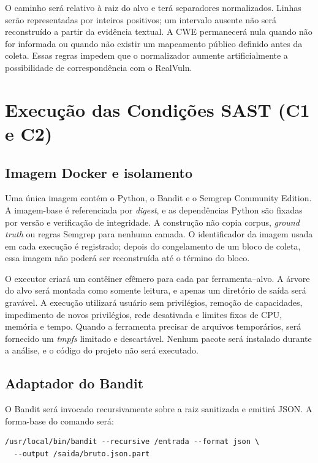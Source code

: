 O caminho será relativo à raiz do alvo e terá separadores normalizados. Linhas serão representadas por inteiros positivos; um intervalo ausente não será reconstruído a partir da evidência textual. A CWE permanecerá nula quando não for informada ou quando não existir um mapeamento público definido antes da coleta. Essas regras impedem que o normalizador aumente artificialmente a possibilidade de correspondência com o RealVuln.

\section{Execução das Condições SAST (C1 e C2)}\label{sec:execucao-sast-desenvolvimento}

\subsection{Imagem Docker e isolamento}\label{subsec:construcao-imagem-docker}

Uma única imagem contém o Python, o Bandit e o Semgrep Community Edition. A imagem-base é referenciada por \textit{digest}, e as dependências Python são fixadas por versão e verificação de integridade. A construção não copia corpus, \textit{ground truth} ou regras Semgrep para nenhuma camada. O identificador da imagem usada em cada execução é registrado; depois do congelamento de um bloco de coleta, essa imagem não poderá ser reconstruída até o término do bloco.

O executor criará um contêiner efêmero para cada par ferramenta--alvo. A árvore do alvo será montada como somente leitura, e apenas um diretório de saída será gravável. A execução utilizará usuário sem privilégios, remoção de capacidades, impedimento de novos privilégios, rede desativada e limites fixos de CPU, memória e tempo. Quando a ferramenta precisar de arquivos temporários, será fornecido um \textit{tmpfs} limitado e descartável. Nenhum pacote será instalado durante a análise, e o código do projeto não será executado.

\subsection{Adaptador do Bandit}\label{subsec:execucao-bandit}

O Bandit será invocado recursivamente sobre a raiz sanitizada e emitirá JSON. A forma-base do comando será:

\begin{verbatim}
/usr/local/bin/bandit --recursive /entrada --format json \
  --output /saida/bruto.json.part
\end{verbatim}

